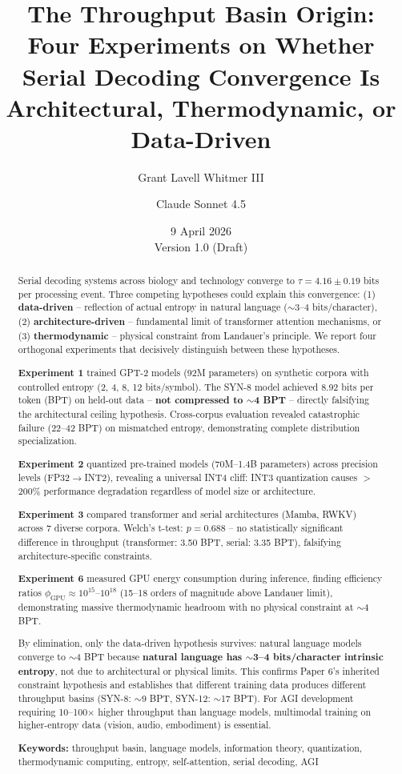 \documentclass[11pt,a4paper]{article}
\title{The Throughput Basin Origin: Four Experiments on Whether Serial Decoding Convergence Is Architectural, Thermodynamic, or Data-Driven}
\author[1]{Grant Lavell Whitmer III}
\author[2]{Claude Sonnet 4.5}
\affil[1]{Windstorm Institute, Team Windstorm, Fort Anne, New York, USA}
\affil[2]{AI Research Partner (Anthropic Claude architecture), Windstorm Institute}
\date{9 April 2026 \\ Version 1.0 (Draft)}
\begin{document}
\maketitle

\begin{abstract}
Serial decoding systems across biology and technology converge to $\tau = 4.16 \pm 0.19$ bits per processing event. Three competing hypotheses could explain this convergence: (1) \textbf{data-driven} -- reflection of actual entropy in natural language ($\sim$3--4 bits/character), (2) \textbf{architecture-driven} -- fundamental limit of transformer attention mechanisms, or (3) \textbf{thermodynamic} -- physical constraint from Landauer's principle. We report four orthogonal experiments that decisively distinguish between these hypotheses.

\textbf{Experiment 1} trained GPT-2 models (92M parameters) on synthetic corpora with controlled entropy (2, 4, 8, 12 bits/symbol). The SYN-8 model achieved 8.92 bits per token (BPT) on held-out data -- \textbf{not compressed to $\sim$4 BPT} -- directly falsifying the architectural ceiling hypothesis. Cross-corpus evaluation revealed catastrophic failure (22--42 BPT) on mismatched entropy, demonstrating complete distribution specialization.

\textbf{Experiment 2} quantized pre-trained models (70M--1.4B parameters) across precision levels (FP32$\rightarrow$INT2), revealing a universal INT4 cliff: INT3 quantization causes $>$200\% performance degradation regardless of model size or architecture.

\textbf{Experiment 3} compared transformer and serial architectures (Mamba, RWKV) across 7 diverse corpora. Welch's t-test: \textbf{$p = 0.688$} -- no statistically significant difference in throughput (transformer: 3.50 BPT, serial: 3.35 BPT), falsifying architecture-specific constraints.

\textbf{Experiment 6} measured GPU energy consumption during inference, finding efficiency ratios $\phi_{\text{GPU}} \approx 10^{15}$--$10^{18}$ (15--18 orders of magnitude above Landauer limit), demonstrating massive thermodynamic headroom with no physical constraint at $\sim$4 BPT.

By elimination, only the data-driven hypothesis survives: natural language models converge to $\sim$4 BPT because \textbf{natural language has $\sim$3--4 bits/character intrinsic entropy}, not due to architectural or physical limits. This confirms Paper 6's inherited constraint hypothesis and establishes that different training data produces different throughput basins (SYN-8: $\sim$9 BPT, SYN-12: $\sim$17 BPT). For AGI development requiring 10--100$\times$ higher throughput than language models, multimodal training on higher-entropy data (vision, audio, embodiment) is essential.

\textbf{Keywords:} throughput basin, language models, information theory, quantization, thermodynamic computing, entropy, self-attention, serial decoding, AGI
\end{abstract}
\end{document}
